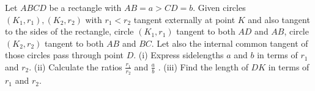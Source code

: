 Let $ABCD$ be a rectangle with $AB=a >CD =b$. Given circles $(K_1,r_1) ,  (K_2,r_2)$  with $r_1<r_2$ tangent externally at point $K$ and also tangent to the sides of the rectangle, circle $(K_1,r_1)$ tangent to both $AD$ and $AB$, circle $(K_2,r_2)$ tangent to both $AB$ and $BC$. Let also the internal common tangent of those circles pass through point $D$.
(i) Express sidelengths $a$ and $b$ in terms of $r_1$ and $r_2$.
(ii) Calculate the ratios $\frac{r_1}{r_2}$ and $\frac{a}{b}$ .
(iii) Find the length of $DK$ in terms of $r_1$ and $r_2$.